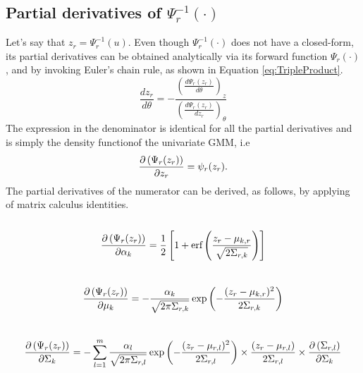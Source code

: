 \documentclass{article}
\begin{document}
\subsection{Partial derivatives of $\Psi^{-1}_r(\cdot)$}\label{apd:gmm_quantile_derivatives}
Let's say that $z_r=\Psi_r^{-1}(u)$. Even though $\Psi^{-1}_r(\cdot)$ does not have a closed-form, its partial derivatives can be obtained analytically via its forward function $\Psi_r(\cdot)$, and by invoking Euler's chain rule, as shown in Equation \eqref{eq:TripleProduct}.
\begin{equation}\label{eq:TripleProduct}
\frac{dz_r}{d\theta}=- \frac{\left(\frac{d\Psi_r(z_r)}{d\theta}\right)_z}{\left(\frac{d\Psi_r(z_r)}{dz_r}\right)_\theta}
\end{equation}
The expression in the denominator is identical for all the partial derivatives and is simply the density functionof the univariate GMM, i.e 
\begin{equation}\label{eq:Gamma_dz}
\der{z_r}{\Psi_r(z_r)}=\psi_r(z_r).
\end{equation}
The partial derivatives of the numerator can be derived, as follows, by applying of matrix calculus identities.
\\
\\
\begin{equation}
\der{\alpha_k}{\Psi_r(z_r)}=\frac{1}{2}\left[1+ \erf \left( \frac{z_r-\mu_{k,r}}{\sqrt{2\Sigma_{r,k}}}\right) \right]
\end{equation}
\\
\begin{equation}
\der{\mu_k}{\Psi_r(z_r)}= -\frac{\alpha_k}{\sqrt{2\pi\Sigma_{r,k}}}\exp\left( - \frac{(z_r-\mu_{k,r})^2}{2\Sigma_{r,k}}	 \right)
\end{equation}
\\
\begin{equation}
\der{\Sigma_k}{\Psi_r(z_r)}= -\sum\limits_{l=1}^{m}\frac{\alpha_l}{\sqrt{2\pi\Sigma_{r,l}}}\exp\left( - \frac{(z_r-\mu_{r,l})^2}{2\Sigma_{r,l}} \right) \times \frac{(z_r-\mu_{r,l})}{2\Sigma_{r,l}} \times \der{\Sigma_k}{\Sigma_{r,l}}
\end{equation}
\end{document}
